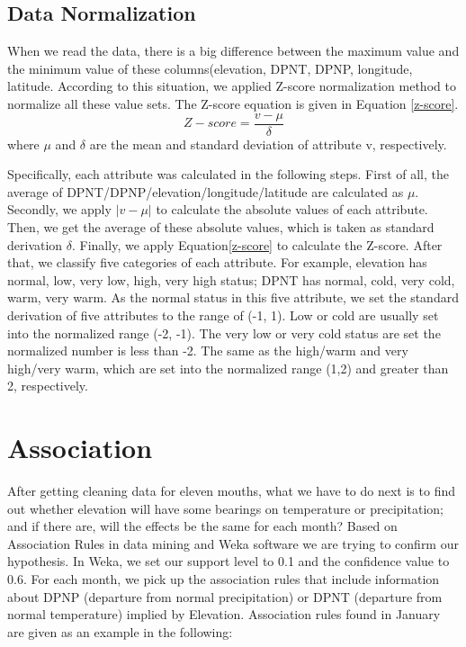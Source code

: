 \documentclass[11pt]{article}
\begin{document}
\subsection{Data Normalization}
When we read the data, there is a big difference between the maximum value and the minimum value of these columns(elevation, DPNT, DPNP, longitude, latitude. According to this situation, we applied Z-score normalization method to normalize all these value sets. The Z-score equation is given in Equation \eqref{z-score}.
\begin{equation}
Z-score = \frac{v-\mu}{\delta} \label{z-score}
\end{equation}
where $\mu$ and $\delta$ are the mean and standard deviation of attribute v, respectively.

Specifically, each attribute was calculated in the following steps. First of all, the average of DPNT/DPNP/elevation/longitude/latitude are calculated as $\mu$. Secondly, we apply $|v-\mu|$ to calculate the absolute values of each attribute. Then, we get the average of these absolute values, which is taken as standard derivation $\delta$. Finally, we apply Equation\eqref{z-score} to calculate the Z-score.
After that, we classify five categories of each attribute. For example, elevation has normal, low, very low, high, very high status; DPNT has normal, cold, very cold, warm, very warm. As the normal status in this five attribute, we set the standard derivation of five attributes to the range of (-1, 1). Low or cold are usually set into the normalized range (-2, -1). The very low or very cold status are set the normalized number is less than -2. The same as the high/warm and very high/very warm, which are set into the normalized range (1,2) and greater than 2, respectively.
\section{Association}
After getting cleaning data for eleven mouths, what we have to do next is to find out whether elevation will have some bearings on temperature or precipitation; and if there are, will the effects be the same for each month?  Based on Association Rules in data mining and Weka software we are trying to confirm our hypothesis.
In Weka, we set our support level to 0.1 and the confidence value to 0.6. For each month, we pick up the association rules that include information about DPNP (departure from normal precipitation) or DPNT (departure from normal temperature) implied by Elevation.  Association rules found in January are given as an example in the following:
\end{document}
